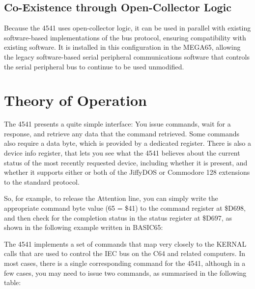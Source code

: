 \subsection{Co-Existence through Open-Collector Logic}

Because the 4541 uses open-collector
logic, it can be used in parallel with existing software-based
implementations of the bus protocol, ensuring compatibility with
existing software.  It is installed in this configuration in the
MEGA65, allowing the legacy software-based serial peripheral
communications software that controls the serial peripheral bus to
continue to be used unmodified.

\section{Theory of Operation}

The 4541 presents a quite simple interface: You issue commands, wait
for a response, and retrieve any data that the command
retrieved.  Some commands also require a data byte, which is provided
by a dedicated register.  There is also a device info register, that lets you see
what the 4541 believes about the current status of the most recently
requested device, including whether it is present, and whether it
supports either or both of the JiffyDOS{\texttrademark} or
Commodore{\texttrademark} 128 extensions to the standard protocol.

So, for example, to release the Attention line, you can simply write
the appropriate command byte value (65 = \$41) to the command register
at \$D698, and then check for the completion status in the status
register at \$D697, as shown in the following example written in
BASIC65:


The 4541 implements a set of commands that map very closely to the
KERNAL calls that are used to control the IEC bus on the C64 and
related computers.  In most cases, there is a single corresponding
command for the 4541, although in a few cases, you may need to issue
two commands, as summarised in the following table:


